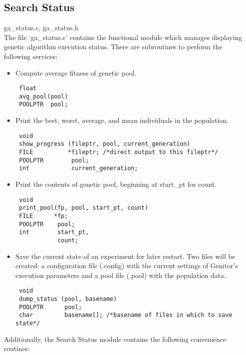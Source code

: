 \subsection{Search Status}

ga\_status.c, ga\_status.h
\\
The file `ga\_status.c' contains the functional module which manages
displaying genetic algorithm execution status.  There are subroutines
to perform the following services:

\begin{itemize}

\item Compute average fitness of genetic pool.
\begin{verbatim}
 float
 avg_pool(pool)
 POOLPTR  pool; 
\end{verbatim}

\item Print the best, worst, average, and mean individuals in the population.
\begin{verbatim}
 void
 show_progress (fileptr, pool, current_generation)
 FILE          *fileptr; /*direct output to this fileptr*/
 POOLPTR        pool;
 int            current_generation;
\end{verbatim}

\item Print the contents of genetic pool, beginning at start\_pt for count.
\begin{verbatim}
 void
 print_pool(fp, pool, start_pt, count)
 FILE      *fp;
 POOLPTR    pool;
 int        start_pt,
			count;
\end{verbatim}

\item Save the current state of an experiment for later restart.  Two
files will be created: a configuration file (.config) with the current
settings of Genitor's execution parameters and a pool file (.pool) with the 
population data.
\begin{verbatim}
 void
 dump_status (pool, basename)
 POOLPTR      pool;
 char         basename[]; /*basename of files in which to save state*/
\end{verbatim}

\end{itemize}

Additionally, the Search Status module contains the following convenience
routines:

